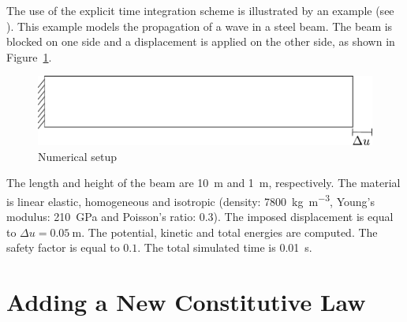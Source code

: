 The use of the explicit time integration scheme is illustrated by an
example (see ).  This
example models the propagation of a wave in a steel beam. The beam is
blocked on one side and a displacement is applied on the other side,
as shown in Figure~\ref{fig:smm:explicit}.

\begin{figure}[!htb] \centering
  \includegraphics[scale=.6]{figures/explicit_dynamic}
  \caption{Numerical setup \label{fig:smm:explicit}}
\end{figure}

The length and height of the beam are \SI{10}{\metre} and
\SI{1}{\metre}, respectively.  The material is linear elastic,
homogeneous and isotropic (density:
\SI{7800}{\kilo\gram\per\cubic\metre}, Young's modulus:
\SI{210}{\giga\pascal} and Poisson's ratio: $0.3$).  The imposed
displacement is equal to $\Delta u = \SI{0.05}{\metre}$. The
potential, kinetic and total energies are computed.  The safety factor
is equal to $0.1$.  The total simulated time is \SI{0.01}{\second}.



\section{Adding a New Constitutive Law}

